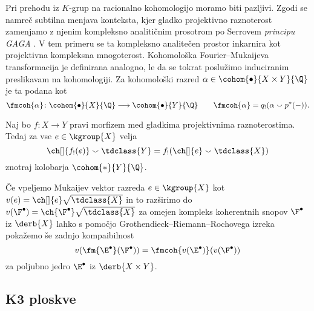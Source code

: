 Pri prehodu iz $K$-grup na racionalno kohomologijo moramo biti pazljivi. Zgodi se namreč subtilna menjava konteksta, kjer gladko projektivno raznoterost zamenjamo z njenim kompleksno analitičnim prosotrom po Serrovem \emph{principu GAGA} \cite{Serre1956}. V tem primeru se ta kompleksno analitečen prostor inkarnira kot projektivna kompleksna mnogoterost. Kohomološka Fourier--Mukaijeva transformacija je definirana analogno, le da se tokrat poslužimo induciranim preslikavam na kohomologiji. Za kohomološki razred $\alpha \in \cohom{\bullet}{X \times Y}{\Q}$ je ta podana kot
\[
    \fmcoh{\alpha} \colon \cohom{\bullet}{X}{\Q} \longrightarrow \cohom{\bullet}{Y}{\Q} \qquad \fmcoh{\alpha} = q_!(\alpha \smallsmile p^*(-)).
\]

\begin{izrek}
    Naj bo $f \colon X \to Y$ pravi morfizem med gladkima projektivnima raznoterostima. Tedaj za vse $e \in \kgroup{X}$ velja
    \begin{equation}
        \ch[]{f_!(e)} \smallsmile \tdclass{Y} = f_!(\ch[]{e} \smallsmile \tdclass{X})
    \end{equation}
    znotraj kolobarja $\cohom{*}{Y}{\Q}$.
\end{izrek}

Če vpeljemo Mukaijev vektor razreda $e \in \kgroup{X}$ kot $v(e) = \ch[]{e}\sqrt{\tdclass{X}}$ in to razširimo do $v(\F^\bullet) = \ch{\F^\bullet}\sqrt{\tdclass{X}}$ za omejen kompleks koherentnih snopov $\F^\bullet$ iz $\derb{X}$ lahko s pomočjo Grothendieck--Riemann--Rochovega izreka pokažemo še zadnjo kompaibilnost
\[
    v(\fm{\E^\bullet}(\F^\bullet)) = \fmcoh{v(\E^\bullet)}(v(\F^\bullet))
\]
za poljubno jedro $\E^\bullet$ iz $\derb{X \times Y}$.

\subsection*{K3 ploskve}

